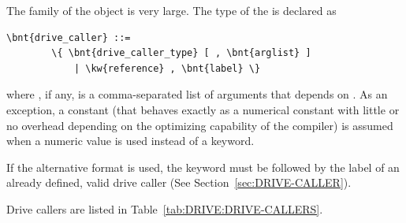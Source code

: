 The family of the  object is very large.
The type of the  is declared as
\begin{Verbatim}[commandchars=\\\{\}]
    \bnt{drive_caller} ::=
        \{ \bnt{drive_caller_type} [ , \bnt{arglist} ]
            | \kw{reference} , \bnt{label} \}
\end{Verbatim}    
where , if any, is a comma-separated list of arguments
that depends on .
As an exception, a constant  (that behaves exactly as a
numerical constant with little or no overhead depending on the optimizing
capability of the compiler) is assumed when a numeric value is used instead
of a keyword.

If the alternative format is used, the keyword  
must be followed by the label of an already defined, valid drive caller
(See Section~\ref{sec:DRIVE-CALLER}).

Drive callers are listed in Table~\ref{tab:DRIVE:DRIVE-CALLERS}.

